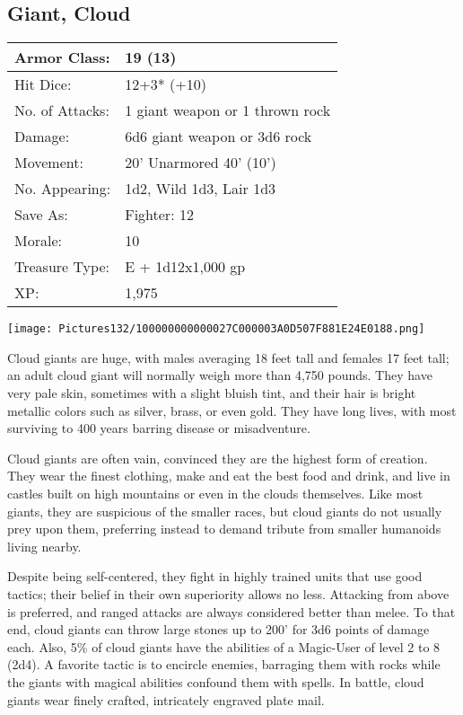 \documentclass[a4paper,twoside,openany,10pt]{book}
\begin{document}
\begin{multicols}{2}
	



\subsection*{Giant, Cloud}\label{giant-cloud}

\begin{tabularx}{0.48\textwidth}{@{}lX@{}}
Armor Class: & 19 (13) \\\hline
Hit Dice: & 12+3* (+10) \\\hline
No. of Attacks: & 1 giant weapon or 1 thrown rock \\\hline
Damage: & 6d6 giant weapon or 3d6 rock \\\hline
Movement: & 20' Unarmored 40'
(10') \\\hline
No. Appearing: & 1d2, Wild 1d3, Lair 1d3 \\\hline
Save As: & Fighter: 12 \\\hline
Morale: & 10 \\\hline
Treasure Type: & E + 1d12x1,000 gp \\\hline
XP: & 1,975 \\\hline
\end{tabularx}\medskip


\begin{center}
	\texttt{[image: Pictures132/100000000000027C000003A0D507F881E24E0188.png]}
\end{center}

Cloud giants are huge, with males averaging 18 feet tall and females 17 feet tall; an adult cloud giant will normally weigh more than 4,750 pounds. They have very pale skin, sometimes with a slight bluish tint, and their hair is bright metallic colors such as silver, brass, or even gold. They have long lives, with most surviving to 400 years barring disease or misadventure.

Cloud giants are often vain, convinced they are the highest form of creation. They wear the finest clothing, make and eat the best food and drink, and live in castles built on high mountains or even in the clouds themselves. Like most giants, they are suspicious of the smaller races, but cloud giants do not usually prey upon them, preferring instead to demand tribute from smaller humanoids living nearby.

Despite being self-centered, they fight in highly trained units that use good tactics; their belief in their own superiority allows no less. Attacking from above is preferred, and ranged attacks are always considered better than melee. To that end, cloud giants can throw large stones up to 200' for 3d6 points of damage each. Also, 5\% of cloud giants have the abilities of a Magic-User of level 2 to 8 (2d4). A favorite tactic is to encircle enemies, barraging them with rocks while the giants with magical abilities confound them with spells. In battle, cloud giants wear finely crafted, intricately engraved plate mail.



\end{multicols}
\end{document}
